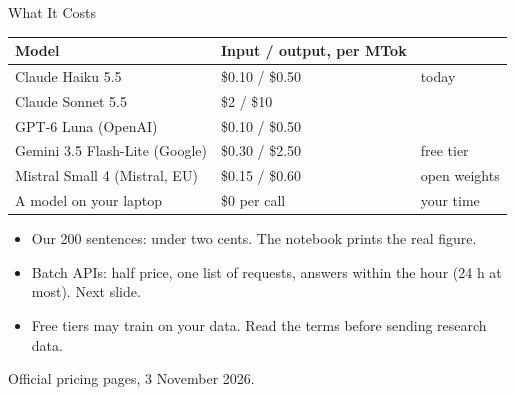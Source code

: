 \documentclass[svgnames,x11names,dvipsnames]{beamer}
\newcommand{\chg}[1]{{\bfseries #1}}
\renewcommand{\chg}[1]{#1}
\begin{document}
\begin{frame}{What It Costs}
\centering
{\footnotesize
\renewcommand{\arraystretch}{1.15}
\begin{tabular}{@{}lll@{}}
\toprule
\textbf{Model} & \textbf{Input / output, per MTok} & \\
\midrule
Claude Haiku 5.5 & \$0.10 / \$0.50 & today \\
Claude Sonnet 5.5 & \$2 / \$10 & \\
GPT-6 Luna (OpenAI) & \$0.10 / \$0.50 & \\
Gemini 3.5 Flash-Lite (Google) & \$0.30 / \$2.50 & free tier \\
Mistral Small 4 (Mistral, EU) & \$0.15 / \$0.60 & open weights \\
A model on your laptop & \$0 per call & your time \\
\bottomrule
\end{tabular}}

\vspace{0.5cm}
\raggedright
\small
\begin{itemize}
    \setlength{\itemsep}{4pt}
    \item Our 200 sentences: under two cents. The notebook prints the real figure.
    \item \chg{Batch APIs: half price, one list of requests, answers within the hour (24 h at most). Next slide.}
    \item Free tiers may train on your data. Read the terms before sending research data.
\end{itemize}

\vspace{0.1cm}
{\scriptsize Official pricing pages, 3 November 2026.}
\end{frame}
\end{document}
